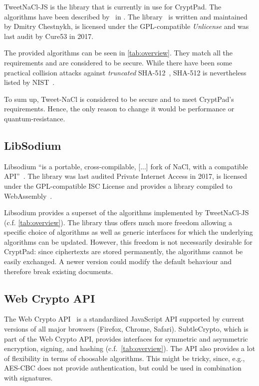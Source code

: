 \documentclass[a4paper, 11pt]{article}
\begin{document}
TweetNaCl-JS is the library that is currently in use for CryptPad.
The algorithms have been described by~\citeauthor{Bernstein2015} in \citeyear{Bernstein2015}.
The library~\cite{Chestnykhm2016} is written and maintained by Dmitry Chestnykh, is licensed under the GPL-compatible \textit{Unlicense} and was last audit by Cure53 in 2017.

The provided algorithms can be seen in  \cref{tab:overview}.
They match all the requirements and are considered to be secure.
While there have been some practical collision attacks against \textit{truncated} SHA-512~\cite{Dobraunig2015}, SHA-512 is nevertheless listed by NIST~\cite{Dworkin2022}.

To sum up, Tweet-NaCl is considered to be secure and to meet CryptPad's requirements.
Hence, the only reason to change it would be performance or quantum-resistance.

\subsection{LibSodium}
\label{sec:libsodium}
Libsodium \enquote{is a portable, cross-compilable, [...] fork of NaCl, with a compatible API}~\cite{Denis2013}.
The library was last audited Private Internet Access in 2017, is licensed under the GPL-compatible ISC License and provides a library compiled to WebAssembly~\cite{BenMrad2015}.

Libsodium provides a superset of the algorithms implemented by TweetNaCl-JS (c.f. \cref{tab:overview}).
The library thus offers much more freedom allowing a specific choice of algorithms as well as generic interfaces for which the underlying algorithms can be updated.
However, this freedom is not necessarily desirable for CryptPad: since ciphertexts are stored permanently, the algorithms cannot be easily exchanged.
A newer version could modify the default behaviour and therefore break existing documents.

\subsection{Web Crypto API}
\label{sec:subtlecrypto}

The Web Crypto API~\cite{Huigen2022} is a standardized JavaScript API supported by current versions of all major browsers (Firefox, Chrome, Safari).
SubtleCrypto, which is part of the Web Crypto API, provides interfaces for symmetric and asymmetric encryption, signing, and hashing (c.f.~\cref{tab:overview}).
The API also provides a lot of flexibility in terms of choosable  algorithms.
This might be tricky, since, e.g., AES-CBC does not provide authentication, but could be used in combination with signatures.
\end{document}
